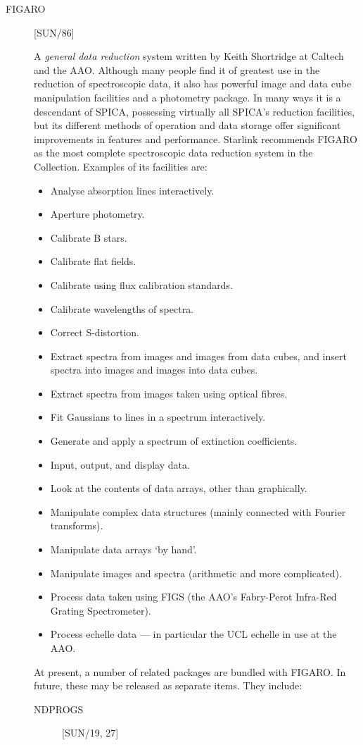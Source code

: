 \begin{description}

\item [FIGARO] \hfill [SUN/86]

A {\em general data reduction} system written by Keith Shortridge at Caltech
and the AAO.
Although many people find it of greatest use in the reduction of
spectroscopic data, it also has powerful image and data cube manipulation
facilities and a photometry package.
In many ways it is a descendant of SPICA, possessing virtually all SPICA's
reduction facilities, but its different methods of operation and data storage
offer significant improvements in features and performance.
Starlink recommends FIGARO as the most complete spectroscopic data reduction
system in the Collection.
Examples of its facilities are:
\begin{itemize}
\item Analyse absorption lines interactively.
\item Aperture photometry.
\item Calibrate B stars.
\item Calibrate flat fields.
\item Calibrate using flux calibration standards.
\item Calibrate wavelengths of spectra.
\item Correct S-distortion.
\item Extract spectra from images and images from data cubes, and insert
 spectra into images and images into data cubes.
\item Extract spectra from images taken using optical fibres.
\item Fit Gaussians to lines in a spectrum interactively.
\item Generate and apply a spectrum of extinction coefficients.
\item Input, output, and display data.
\item Look at the contents of data arrays, other than graphically.
\item Manipulate complex data structures (mainly connected with Fourier
 transforms).
\item Manipulate data arrays `by hand'.
\item Manipulate images and spectra (arithmetic and more complicated).
\item Process data taken using FIGS (the AAO's Fabry-Perot Infra-Red Grating
Spectrometer).
\item Process echelle data --- in particular the UCL echelle in use at the AAO.
\end{itemize}
At present, a number of related packages are bundled with FIGARO.
In future, these may be released as separate items.
They include:
\begin{description}
\item [NDPROGS] \hfill [SUN/19, 27]


\end{description}
\end{description}
